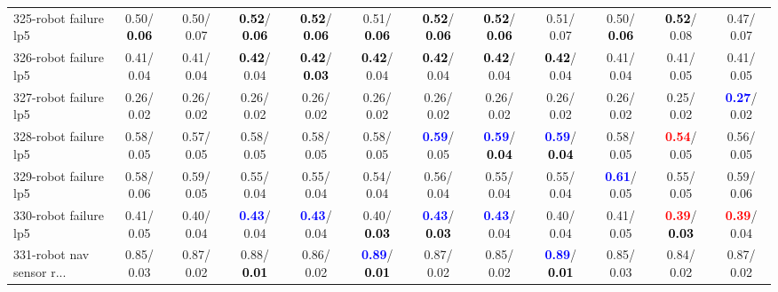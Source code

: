 \begin{table}[h]
\begin{center}
{\begin{tabular}{lc|c|c|c|c|c|c|c|c|c|c}
325-robot failure lp5 &   0.50/\textcolor{black}{\textbf{  0.06}} &   0.50/  0.07 & \textcolor{black}{\textbf{  0.52}}/\textcolor{black}{\textbf{  0.06}} & \textcolor{black}{\textbf{  0.52}}/\textcolor{black}{\textbf{  0.06}} &   0.51/\textcolor{black}{\textbf{  0.06}} & \textcolor{black}{\textbf{  0.52}}/\textcolor{black}{\textbf{  0.06}} & \textcolor{black}{\textbf{  0.52}}/\textcolor{black}{\textbf{  0.06}} &   0.51/  0.07 &   0.50/\textcolor{black}{\textbf{  0.06}} & \textcolor{black}{\textbf{  0.52}}/  0.08 &   0.47/  0.07 \\
326-robot failure lp5 &   0.41/  0.04 &   0.41/  0.04 & \textcolor{black}{\textbf{  0.42}}/  0.04 & \textcolor{black}{\textbf{  0.42}}/\textcolor{black}{\textbf{  0.03}} & \textcolor{black}{\textbf{  0.42}}/  0.04 & \textcolor{black}{\textbf{  0.42}}/  0.04 & \textcolor{black}{\textbf{  0.42}}/  0.04 & \textcolor{black}{\textbf{  0.42}}/  0.04 &   0.41/  0.04 &   0.41/  0.05 &   0.41/  0.05 \\
327-robot failure lp5 &   0.26/  0.02 &   0.26/  0.02 &   0.26/  0.02 &   0.26/  0.02 &   0.26/  0.02 &   0.26/  0.02 &   0.26/  0.02 &   0.26/  0.02 &   0.26/  0.02 &   0.25/  0.02 & \textcolor{blue}{\textbf{  0.27}}/  0.02 \\ \hline
328-robot failure lp5 &   0.58/  0.05 &   0.57/  0.05 &   0.58/  0.05 &   0.58/  0.05 &   0.58/  0.05 & \textcolor{blue}{\textbf{  0.59}}/  0.05 & \textcolor{blue}{\textbf{  0.59}}/\textcolor{black}{\textbf{  0.04}} & \textcolor{blue}{\textbf{  0.59}}/\textcolor{black}{\textbf{  0.04}} &   0.58/  0.05 & \textcolor{red}{\textbf{  0.54}}/  0.05 &   0.56/  0.05 \\
329-robot failure lp5 &   0.58/  0.06 &   0.59/  0.05 &   0.55/  0.04 &   0.55/  0.04 &   0.54/  0.04 &   0.56/  0.04 &   0.55/  0.04 &   0.55/  0.04 & \textcolor{blue}{\textbf{  0.61}}/  0.05 &   0.55/  0.05 &   0.59/  0.06 \\
330-robot failure lp5 &   0.41/  0.05 &   0.40/  0.04 & \textcolor{blue}{\textbf{  0.43}}/  0.04 & \textcolor{blue}{\textbf{  0.43}}/  0.04 &   0.40/\textcolor{black}{\textbf{  0.03}} & \textcolor{blue}{\textbf{  0.43}}/\textcolor{black}{\textbf{  0.03}} & \textcolor{blue}{\textbf{  0.43}}/  0.04 &   0.40/  0.04 &   0.41/  0.05 & \textcolor{red}{\textbf{  0.39}}/\textcolor{black}{\textbf{  0.03}} & \textcolor{red}{\textbf{  0.39}}/  0.04 \\
331-robot nav sensor r... &   0.85/  0.03 &   0.87/  0.02 &   0.88/\textcolor{black}{\textbf{  0.01}} &   0.86/  0.02 & \textcolor{blue}{\textbf{  0.89}}/\textcolor{black}{\textbf{  0.01}} &   0.87/  0.02 &   0.85/  0.02 & \textcolor{blue}{\textbf{  0.89}}/\textcolor{black}{\textbf{  0.01}} &   0.85/  0.03 &   0.84/  0.02 &   0.87/  0.02 \\

\end{tabular}}
\end{center}
\end{table}
